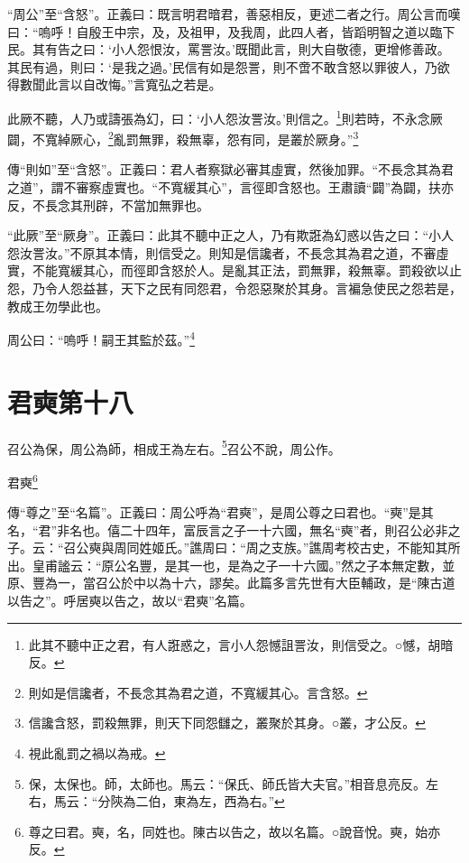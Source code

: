 {\noindent\shu{}\fzkt “周公”至“含怒”。正義曰：既言明君暗君，善惡相反，更述二者之行。周公言而嘆曰：“嗚呼！自殷王中宗，及，及祖甲，及我周，此四人者，皆蹈明智之道以臨下民。其有告之曰：‘小人怨恨汝，罵詈汝。’既聞此言，則大自敬德，更增修善政。其民有過，則曰：‘是我之過。’民信有如是怨詈，則不啻不敢含怒以罪彼人，乃欲得數聞此言以自改悔。”言寬弘之若是。 \par}

此厥不聽，人乃或譸張為幻，曰：‘小人怨汝詈汝。’則信之。\footnote{此其不聽中正之君，有人誑惑之，言小人怨憾詛詈汝，則信受之。○憾，胡暗反。}則若時，不永念厥闢，不寬綽厥心，\footnote{則如是信讒者，不長念其為君之道，不寬緩其心。言含怒。}亂罰無罪，殺無辜，怨有同，是叢於厥身。”\footnote{信讒含怒，罰殺無罪，則天下同怨讎之，叢聚於其身。○叢，才公反。}


{\noindent\zhuan{}\fzbyks 傳“則如”至“含怒”。正義曰：君人者察獄必審其虛實，然後加罪。“不長念其為君之道”，謂不審察虛實也。“不寬緩其心”，言徑即含怒也。王肅讀“闢”為闢，扶亦反，不長念其刑辟，不當加無罪也。 \par}

{\noindent\shu{}\fzkt “此厥”至“厥身”。正義曰：此其不聽中正之人，乃有欺誑為幻惑以告之曰：“小人怨汝詈汝。”不原其本情，則信受之。則知是信讒者，不長念其為君之道，不審虛實，不能寬緩其心，而徑即含怒於人。是亂其正法，罰無罪，殺無辜。罰殺欲以止怨，乃令人怨益甚，天下之民有同怨君，令怨惡聚於其身。言褊急使民之怨若是，教成王勿學此也。 \par}

周公曰：“嗚呼！嗣王其監於茲。”\footnote{視此亂罰之禍以為戒。}

\section{君奭第十八}


召公為保，周公為師，相成王為左右。\footnote{保，太保也。師，太師也。馬云：“保氏、師氏皆大夫官。”相音息亮反。左右，馬云：“分陝為二伯，東為左，西為右。”}召公不說，周公作。

君奭\footnote{尊之曰君。奭，名，同姓也。陳古以告之，故以名篇。○說音悅。奭，始亦反。}


{\noindent\zhuan{}\fzbyks 傳“尊之”至“名篇”。正義曰：周公呼為“君奭”，是周公尊之曰君也。“奭”是其名，“君”非名也。僖二十四年，富辰言之子一十六國，無名“奭”者，則召公必非之子。云：“召公奭與周同姓姬氏。”譙周曰：“周之支族。”譙周考校古史，不能知其所出。皇甫謐云：“原公名豐，是其一也，是為之子一十六國。”然之子本無定數，並原、豐為一，當召公於中以為十六，謬矣。此篇多言先世有大臣輔政，是“陳古道以告之”。呼居奭以告之，故以“君奭”名篇。 \par}

